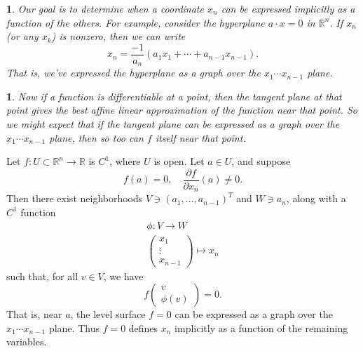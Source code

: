 \documentclass[12pt]{article}
\newtheorem{para}[theorem]{}
\begin{document}
\begin{para} 
	Our goal is to determine when a coordinate $x_n$ can be expressed implicitly as a function of the others. For example, consider the hyperplane $a\cdot x=0$ in $\mathbb{R}^n$. If $x_n$ (or any $x_k$) is nonzero, then we can write 
	\begin{equation*}
		x_n = \frac{-1}{a_n}(a_1x_1 + \cdots + a_{n-1}x_{n-1}).
	\end{equation*}
	That is, we've expressed the hyperplane as a graph over the $x_1\cdots x_{n-1}$ plane.
\end{para}	

\begin{para} 
	Now if a function is differentiable at a point, then the tangent plane at that point gives the best affine linear approximation of the function near that point. So we might expect that if the tangent plane can be expressed as a graph over the $x_1\cdots x_{n-1}$ plane, then so too can $f$ itself near that point.
\end{para}	

\begin{theorem}
	Let $f:U\subset\mathbb{R}^n\to\mathbb{R}$ is $C^1$, where $U$ is open. Let $a\in U$, and suppose 
	\begin{equation*}
		f(a) = 0,\quad \frac{\partial f}{\partial x_n}(a)\neq 0.
	\end{equation*}
	Then there exist neighborhoods $V\ni (a_1,\dots,a_{n-1})^T$ and $W\ni a_n$, along with a $C^1$ function 
	\begin{gather*}
		\phi: V \to W \\
		\begin{pmatrix} x_1 \\ \vdots \\ x_{n-1} \end{pmatrix} \mapsto x_n 
	\end{gather*}
	such that, for all $v\in V$, we have 
	\begin{equation*}
		f\begin{pmatrix} v \\ \phi(v) \end{pmatrix} = 0.
	\end{equation*}
	That is, near $a$, the level surface $f=0$ can be expressed as a graph over the $x_1\cdots x_{n-1}$ plane. Thus $f=0$ defines $x_n$ implicitly as a function of the remaining variables.
\end{theorem}
\end{document}
